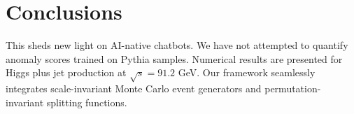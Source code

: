 \section{Conclusions}\label{sec:conclusions}

This sheds new light on AI-native chatbots. We have not attempted to
quantify anomaly scores trained on Pythia samples. Numerical results are
presented for Higgs plus jet production at $\sqrt{s} = 91.2$ GeV. Our
framework seamlessly integrates scale-invariant Monte Carlo event
generators and permutation-invariant splitting functions.

